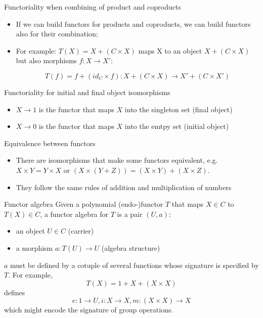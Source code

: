 \documentclass[presentation]{beamer}
\begin{document}
\begin{frame}[label={sec:orgf859fc8}]{Functoriality when combining of product and coproducts}
\begin{itemize}
\item If we can build functors for products and coproducts, we can build functors
also for their combination;

\item For example: \(T(X) = X + (C \times X)\)
maps X to an object \(X + (C \times X)\) but also morphisms \(f: X \rightarrow X'\):

$$T(f) = f + (id_C \times f): X+(C\times X) \rightarrow X'+(C \times X')$$
\end{itemize}
\end{frame}

\begin{frame}[label={sec:orgcb2cd62}]{Functoriality for initial and final object isomorphisms}
\begin{itemize}
\item \(X \rightarrow 1\) is the functor that maps \(X\) into the singleton set (final object)

\item \(X \rightarrow 0\) is the functor that maps \(X\) into the emtpy set (initial object)
\end{itemize}
\end{frame}

\begin{frame}[label={sec:orge918dca}]{Equivalence between functors}
\begin{itemize}
\item There are isomorphisms that make some functors equivalent, e.g. \(X \times
      Y = Y \times X\) or \((X \times (Y + Z)) = (X \times Y) + (X \times Z)\).

\item They follow the same rules of addition and multiplication of numbers
\end{itemize}
\end{frame}
\begin{frame}[label={sec:org15a9e60}]{Functor algebra}
Given a polynomial (endo-)functor \(T\) that maps \(X \in C\) to \(T(X) \in
    C\), a functor algebra for \(T\) is a pair \((U,a)\):

\begin{itemize}
\item an object \(U \in C\) (\alert{carrier})
\item a morphism \(a: T(U) \rightarrow U\) (\alert{algebra structure})
\end{itemize}

\(a\) must be defined by a cotuple of several functions whose signature is
specified by \(T\). For example, $$T(X) = 1 + X + (X \times X)$$ defines $$e:
    1 \rightarrow U, i: X \rightarrow X, m: (X \times X) \rightarrow X$$ which
might encode the signature of group operations.
\end{frame}
\end{document}

